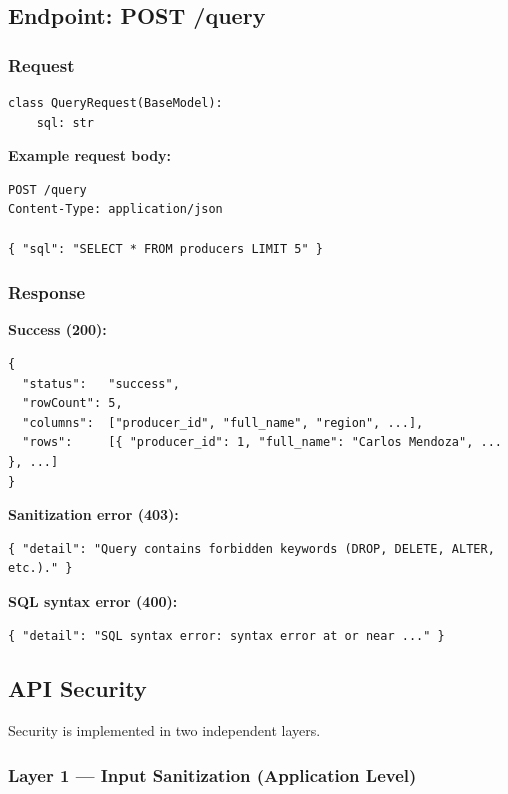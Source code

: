 \documentclass[12pt, a4paper]{article}
\begin{document}
\subsection{Endpoint: POST /query}

\subsubsection{Request}

\begin{lstlisting}[style=pythonstyle, caption={Pydantic request model}]
class QueryRequest(BaseModel):
    sql: str
\end{lstlisting}

\textbf{Example request body:}
\begin{lstlisting}[style=bashstyle]
POST /query
Content-Type: application/json

{ "sql": "SELECT * FROM producers LIMIT 5" }
\end{lstlisting}

\subsubsection{Response}

\textbf{Success (200):}
\begin{lstlisting}[style=bashstyle]
{
  "status":   "success",
  "rowCount": 5,
  "columns":  ["producer_id", "full_name", "region", ...],
  "rows":     [{ "producer_id": 1, "full_name": "Carlos Mendoza", ... }, ...]
}
\end{lstlisting}

\textbf{Sanitization error (403):}
\begin{lstlisting}[style=bashstyle]
{ "detail": "Query contains forbidden keywords (DROP, DELETE, ALTER, etc.)." }
\end{lstlisting}

\textbf{SQL syntax error (400):}
\begin{lstlisting}[style=bashstyle]
{ "detail": "SQL syntax error: syntax error at or near ..." }
\end{lstlisting}

\subsection{API Security}

Security is implemented in two independent layers.

\subsubsection{Layer 1 — Input Sanitization (Application Level)}
\end{document}
